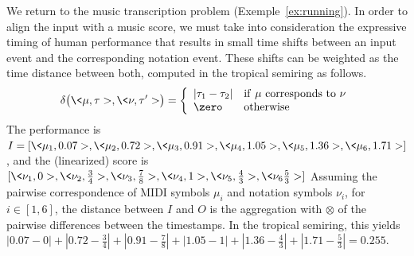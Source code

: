 
\begin{example}\label{distance-time}
We return to the music transcription problem (Exemple~\ref{ex:running}). In order to align the
input with a music score, we must take into consideration
the expressive timing of human performance that
results in small time shifts between an input event and the corresponding
notation event.  These shifts can be weighted as the time distance between both,
computed in the tropical semiring as follows.
$$\delta\bigl(\<\mu, \tau>, \<\nu, \tau'>\bigr) =
\left\{
\begin{array}{ll}
   | \tau_1 - \tau_2 | & \mathrm{if}\  \mu \rm{\ corresponds\  to\ } \nu \\
   \zero  & \mathrm{otherwise}
\end{array}
\right.$$
The performance is
$I = [ \<\mu_1, 0.07>, \<\mu_2, 0.72>, \<\mu_3, 0.91>, \<\mu_4, 1.05>, \<\mu_5, 1.36>, \<\mu_6, 1.71>]$,
and the (linearized) score is
$[\<\nu_1,0>, \<\nu_2,\frac{3}{4}>, \<\nu_3,\frac{7}{8}>, \<\nu_4,1>, \<\nu_5,\frac{4}{3}>, \<\nu_6\frac{5}{3}>]$
Assuming the pairwise correspondence of MIDI symbols
$\mu_i$ and notation symbols $\nu_i$, for $i \in [1, 6]$,
the distance between $I$ and $O$ is the  aggregation with $\otimes$
of the pairwise differences between the
timestamps. In the tropical semiring, this yields
$|0.07 - 0| + |0.72 - \frac{3}{4}| + |0.91- \frac{7}{8} | +
|1.05-1| + |1.36-\frac{4}{3}| + |1.71-\frac{5}{3}|= 0.255$.
\endex
\end{example}





